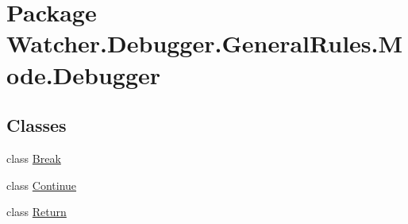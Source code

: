 \hypertarget{namespace_watcher_1_1_debugger_1_1_general_rules_1_1_mode_1_1_debugger}{\section{Package Watcher.\+Debugger.\+General\+Rules.\+Mode.\+Debugger}
\label{namespace_watcher_1_1_debugger_1_1_general_rules_1_1_mode_1_1_debugger}
}
\subsection*{Classes}
\begin{DoxyCompactItemize}
\item 
class \hyperlink{class_watcher_1_1_debugger_1_1_general_rules_1_1_mode_1_1_debugger_1_1_break}{Break}
\item 
class \hyperlink{class_watcher_1_1_debugger_1_1_general_rules_1_1_mode_1_1_debugger_1_1_continue}{Continue}
\item 
class \hyperlink{class_watcher_1_1_debugger_1_1_general_rules_1_1_mode_1_1_debugger_1_1_return}{Return}
\end{DoxyCompactItemize}
